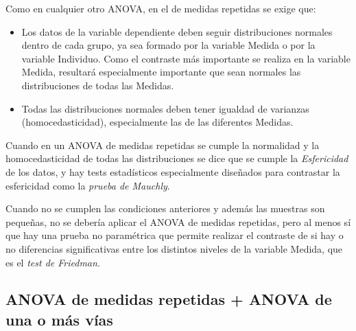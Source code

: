 \documentclass[
  a4paper,
]{scrreport}
\theoremstyle{plain}
\theoremstyle{definition}
\theoremstyle{definition}
\theoremstyle{remark}
\begin{document}
Como en cualquier otro ANOVA, en el de medidas repetidas se exige que:

\begin{itemize}
\item
  Los datos de la variable dependiente deben seguir distribuciones
  normales dentro de cada grupo, ya sea formado por la variable Medida o
  por la variable Individuo. Como el contraste más importante se realiza
  en la variable Medida, resultará especialmente importante que sean
  normales las distribuciones de todas las Medidas.
\item
  Todas las distribuciones normales deben tener igualdad de varianzas
  (homocedasticidad), especialmente las de las diferentes Medidas.
\end{itemize}

Cuando en un ANOVA de medidas repetidas se cumple la normalidad y la
homocedasticidad de todas las distribuciones se dice que se cumple la
\emph{Esfericidad} de los datos, y hay tests estadísticos especialmente
diseñados para contrastar la esfericidad como la \emph{prueba de
Mauchly}.

Cuando no se cumplen las condiciones anteriores y además las muestras
son pequeñas, no se debería aplicar el ANOVA de medidas repetidas, pero
al menos sí que hay una prueba no paramétrica que permite realizar el
contraste de si hay o no diferencias significativas entre los distintos
niveles de la variable Medida, que es el \emph{test de Friedman}.

\subsection{ANOVA de medidas repetidas + ANOVA de una o más
vías}\label{anova-de-medidas-repetidas-anova-de-una-o-muxe1s-vuxedas}
\end{document}
